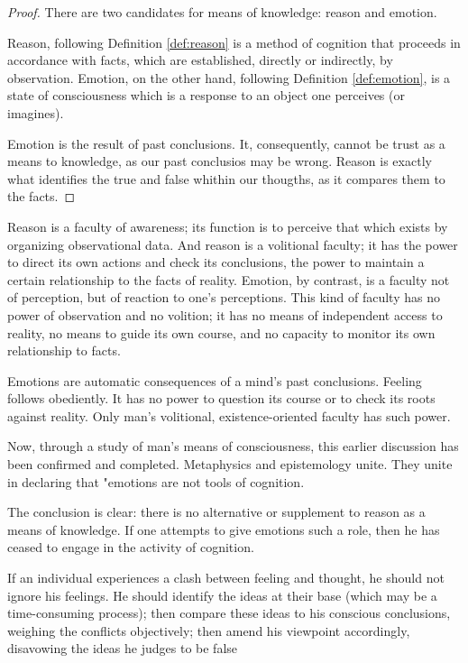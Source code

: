             \begin{proof}
                There are two candidates for means of knowledge: reason and emotion.

                Reason, following Definition \ref{def:reason} is a method of cognition that proceeds in accordance with facts, which are established, directly or indirectly, by observation. Emotion, on the other hand, following Definition \ref{def:emotion}, is a state of consciousness which is a response to an object one perceives (or imagines).

                Emotion is the result of past conclusions. It, consequently, cannot be trust as a means to knowledge, as our past conclusios may be wrong. Reason is exactly what identifies the true and false whithin our thougths, as it compares them to the facts.
            \end{proof}
            
        Reason is a faculty of awareness; its function is to perceive that which exists by organizing observational data. And reason is a volitional faculty; it has the power to direct its own actions and check its conclusions, the power to maintain a certain relationship to the facts of reality. Emotion, by contrast, is a faculty not of perception, but of reaction to one's perceptions. This kind of faculty has no power of observation and no volition; it has no means of independent access to reality, no means to guide its own course, and no capacity to monitor its own relationship to facts.
        
        Emotions are automatic consequences of a mind's past conclusions. Feeling follows obediently. It has no power to question its course or to check its roots against reality. Only man's volitional, existence-oriented faculty has such power.
        
        Now, through a study of man's means of consciousness, this earlier discussion has been confirmed and completed. Metaphysics and epistemology unite. They unite in declaring that "emotions are not tools of cognition.
        
        The conclusion is clear: there is no alternative or supplement to reason as a means of knowledge. If one attempts to give emotions such a role, then he has ceased to engage in the activity of cognition.
        
        If an individual experiences a clash between feeling and thought, he should not ignore his feelings. He should identify the ideas at their base (which may be a time-consuming process); then compare these ideas to his conscious conclusions, weighing the conflicts objectively; then amend his viewpoint accordingly, disavowing the ideas he judges to be false
        

